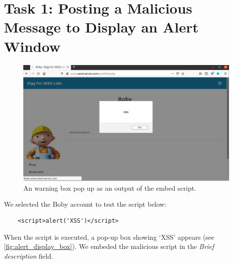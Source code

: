 \section{Task 1: Posting a Malicious Message to Display an Alert Window}
%

\begin{figure}
    \centering
    \includegraphics[height=\textheight,width=\textwidth,keepaspectratio]
    {figures/display_alert_xss.png}
    \caption{An warning box pop up as an output of the embed script.}
    \label{fig:alert_display_box}
\end{figure}

We selected the {\selectfont Boby} account to test
the script below:

\begin{lstlisting}
    <script>alert('XSS')</script>
\end{lstlisting}

When the script is executed, a pop-up box showing `XSS' appears (see \autoref{fig:alert_display_box}).
We embeded the malicious script in the \emph{Brief description} field.